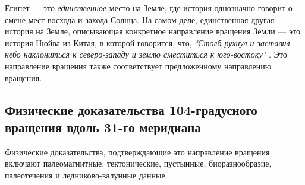 \documentclass[10pt,twocolumn,letterpaper]{article}
\begin{document}
Египет — это \textit{единственное} место на Земле, где история однозначно говорит о смене мест восхода и захода Солнца. На самом деле, единственная другая история на Земле, описывающая конкретное направление вращения Земли — это история Нюйва из Китая, в которой говорится, что, \textit{"Столб рухнул и заставил небо наклониться к северо-западу и землю сместиться к юго-востоку"} \cite{8}. Это направление вращения также соответствует предложенному направлению вращения.

\subsection{Физические доказательства 104-градусного вращения вдоль 31-го меридиана}

Физические доказательства, подтверждающие это направление вращения, включают палеомагнитные, тектонические, пустынные, биоразнообразие, палеотечения и ледниково-валунные данные.
\end{document}
